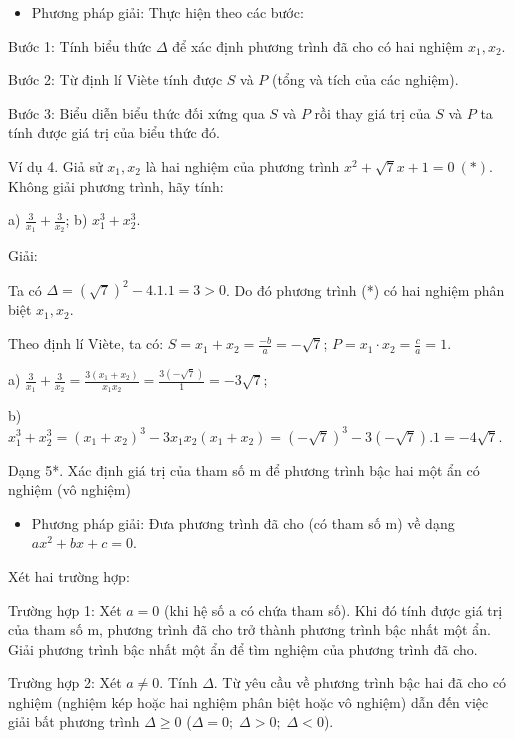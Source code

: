 \documentclass[%
    fontsize=12pt,%
    chapterprefix=false,%
    open=right,%
    twoside=false,%
    numbers=noenddot,%
    headings=optiontohead,%
    final,%
    DIV=15,%
    parskip=half %
]{scrbook}
\begin{document}
\begin{itemize}
  \item Phương pháp giải: Thực hiện theo các bước:
\end{itemize}

Bước 1: Tính biểu thức $ \Delta $ để xác định phương trình đã cho có hai nghiệm $ x_1, x_2 $.

Bước 2: Từ định lí Viète tính được $ S $ và $ P $ (tổng và tích của các nghiệm).

Bước 3: Biểu diễn biểu thức đối xứng qua $ S $ và $ P $ rồi thay giá trị của $ S $ và $ P $ ta tính được giá trị của biểu thức đó.

Ví dụ 4. Giả sử $ x_1, x_2 $ là hai nghiệm của phương trình $ x^2 + \sqrt{7}x + 1 = 0 \ (*) $. Không giải phương trình, hãy tính:

a) $ \frac{3}{x_1} + \frac{3}{x_2} $; b) $ x_1^3 + x_2^3 $.

Giải:

Ta có $ \Delta = (\sqrt{7})^2 - 4.1.1 = 3 > 0 $. Do đó phương trình (*) có hai nghiệm phân biệt $ x_1, x_2 $.

Theo định lí Viète, ta có: $ S = x_1 + x_2 = \frac{-b}{a} = -\sqrt{7} $; $ P = x_1 \cdot x_2 = \frac{c}{a} = 1 $.

a) $ \frac{3}{x_1} + \frac{3}{x_2} = \frac{3(x_1 + x_2)}{x_1 x_2} = \frac{3(-\sqrt{7})}{1} = -3\sqrt{7} $;

b) $ x_1^3 + x_2^3 = (x_1 + x_2)^3 - 3x_1 x_2 (x_1 + x_2) = (-\sqrt{7})^3 - 3(-\sqrt{7}).1 = -4\sqrt{7} $.


Dạng 5*. Xác định giá trị của tham số m để phương trình bậc hai một ẩn có nghiệm (vô nghiệm)

\begin{itemize}
  \item Phương pháp giải: Đưa phương trình đã cho (có tham số m) về dạng $ ax^2 + bx + c = 0 $.
\end{itemize}

Xét hai trường hợp:

Trường hợp 1: Xét $ a = 0 $ (khi hệ số a có chứa tham số). Khi đó tính được giá trị của tham số m, phương trình đã cho trở thành phương trình bậc nhất một ẩn. Giải phương trình bậc nhất một ẩn để tìm nghiệm của phương trình đã cho.

Trường hợp 2: Xét $ a \neq 0 $. Tính $ \Delta $. Từ yêu cầu về phương trình bậc hai đã cho có nghiệm (nghiệm kép hoặc hai nghiệm phân biệt hoặc vô nghiệm) dẫn đến việc giải bất phương trình $ \Delta \geq 0 $ ($ \Delta = 0; \; \Delta > 0; \; \Delta < 0 $).
\end{document}

